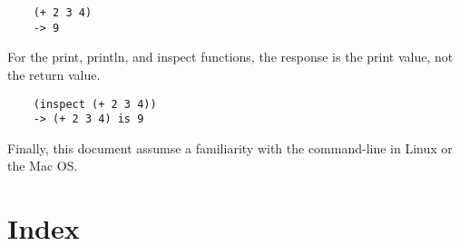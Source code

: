 \documentclass{book}
\begin{document}
\begin{verbatim}
    (+ 2 3 4)
    -> 9
\end{verbatim}

For the print, println, and inspect functions, the response
is the print value, not the return value.

\begin{verbatim}
    (inspect (+ 2 3 4))
    -> (+ 2 3 4) is 9
\end{verbatim}

Finally, this document assumse a familiarity with the command-line in
Linux or the Mac OS.














%
%
%
%
%
%
%
%
%
%
%
%

\T\printindex
\W\chapter*{Index}
\W\htmlprintindex
\end{document}
